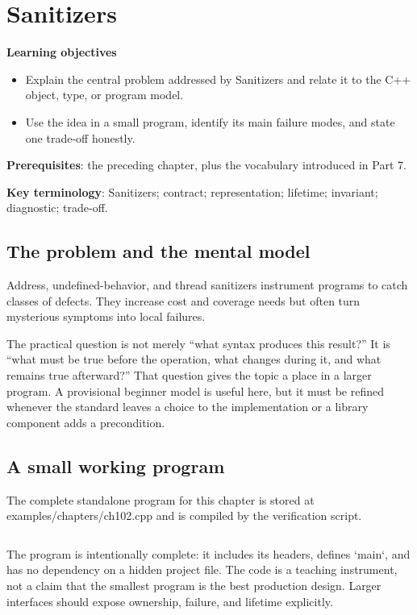 \chapter{Sanitizers}
\begin{chaptermeta}
\textbf{Learning objectives}
\begin{itemize}
  \item Explain the central problem addressed by Sanitizers and relate it to the C++ object, type, or program model.
  \item Use the idea in a small program, identify its main failure modes, and state one trade-off honestly.
\end{itemize}
\textbf{Prerequisites}: the preceding chapter, plus the vocabulary introduced in Part 7.

\textbf{Key terminology}: Sanitizers; contract; representation; lifetime; invariant; diagnostic; trade-off.
\end{chaptermeta}

\section{The problem and the mental model}
Address, undefined-behavior, and thread sanitizers instrument programs to catch classes of defects. They increase cost and coverage needs but often turn mysterious symptoms into local failures.

The practical question is not merely “what syntax produces this result?” It is “what must be true before the operation, what changes during it, and what remains true afterward?” That question gives the topic a place in a larger program. A provisional beginner model is useful here, but it must be refined whenever the standard leaves a choice to the implementation or a library component adds a precondition.

\section{A small working program}
The complete standalone program for this chapter is stored at examples/chapters/ch102.cpp and is compiled by the verification script.

\inputminted[fontsize=\scriptsize,breaklines]{cpp}{examples/chapters/ch102.cpp}

The program is intentionally complete: it includes its headers, defines `main`, and has no dependency on a hidden project file. The code is a teaching instrument, not a claim that the smallest program is the best production design. Larger interfaces should expose ownership, failure, and lifetime explicitly.

